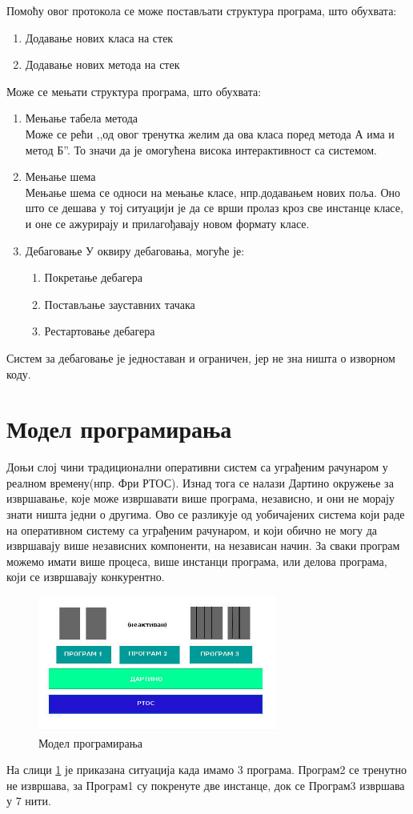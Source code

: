\documentclass[12pt,oneside]{memoir}
\begin{document}
Помоћу овог протокола се може постављати структура програма, што обухвата:
\begin{enumerate}
\item Додавање нових класа на стек
\item Додавање нових метода на стек
\end{enumerate}
Може се мењати структура програма, што обухвата:
\begin{enumerate}
\item Мењање табела метода\\
Може се рећи ,,од овог тренутка желим да ова класа поред метода А има и метод Б''. То значи да је омогућена висока интерактивност са системом.
\item Мењање шема\\
Мењање шема се односи на мењање класе, нпр.додавањем нових поља. Оно што се дешава у тој ситуацији је да се врши пролаз кроз све инстанце класе, и оне се ажурирају и прилагођавају новом формату класе.
\item Дебаговање
У оквиру дебаговања, могуће је:
\begin{enumerate}
\item Покретање дебагера
\item Постављање зауставних тачака
\item Рестартовање дебагера
\end{enumerate}
\end{enumerate}
Систем за дебаговање је једноставан и ограничен, јер не зна ништа о изворном коду.
\section{Модел програмирања}

Доњи слој чини традиционални оперативни систем са уграђеним рачунаром у реалном времену(нпр. Фри РТОС). Изнад тога се налази Дартино окружење за извршавање, које може извршавати више програма, независно, и они не морају знати ништа једни о другима. Ово се разликује од уобичајених система који раде на оперативном систему са уграђеним рачунаром, и који обично не могу да извршавају више независних компоненти, на независан начин. За сваки програм можемо имати више процеса, више инстанци програма, или делова програма, који се извршавају конкурентно.

\begin{figure}[!ht]
  \centering
  \includegraphics[width=0.7\textwidth]{arhitektura.jpg}
  \caption{Модел програмирања}
  \label{fig:model}
\end{figure}
На слици \ref{fig:model} је приказана ситуација када имамо 3 програма. Програм2 се тренутно не извршава, за Програм1 су покренуте две инстанце, док се Програм3  извршава у 7 нити.
\end{document}
